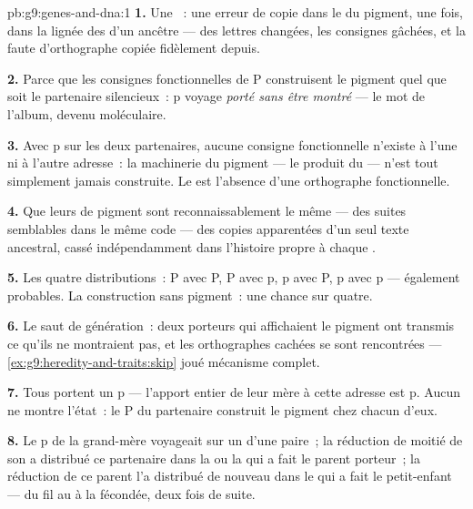 \begin{solution}{pb:g9:genes-and-dna:1}
\textbf{1.} Une ~: une erreur de copie dans le 
du pigment, une fois, dans la lignée des  d'un
ancêtre --- des lettres changées, les consignes gâchées, et
la faute d'orthographe copiée fidèlement depuis.

\textbf{2.} Parce que les consignes fonctionnelles de P
construisent le pigment quel que soit le partenaire
silencieux~: p voyage \emph{porté sans être montré} --- le
mot de l'album, devenu moléculaire.

\textbf{3.} Avec p sur les deux partenaires, aucune consigne
fonctionnelle n'existe à l'une ni à l'autre adresse~: la
machinerie du pigment --- le produit du  --- n'est tout
simplement jamais construite. Le  est l'absence
d'une orthographe fonctionnelle.

\textbf{4.} Que leurs  de pigment sont reconnaissablement
le même  --- des suites semblables dans le même code ---
des copies apparentées d'un seul texte ancestral, cassé
indépendamment dans l'histoire propre à chaque .

\textbf{5.} Les quatre distributions~: P avec P, P avec p, p
avec P, p avec p --- également probables. La construction
sans pigment~: une chance sur quatre.

\textbf{6.} Le saut de génération~: deux porteurs qui
affichaient le pigment ont transmis ce qu'ils ne montraient
pas, et les orthographes cachées se sont rencontrées ---
\cref{ex:g9:heredity-and-traits:skip} joué mécanisme complet.

\textbf{7.} Tous portent un p --- l'apport entier de leur
mère à cette adresse est p. Aucun ne montre l'état~: le P du
partenaire construit le pigment chez chacun d'eux.

\textbf{8.} Le p de la grand-mère voyageait sur un
 d'une paire~; la réduction de moitié de son
 a distribué ce partenaire dans la  ou la
 qui a fait le parent porteur~; la réduction de
ce parent l'a distribué de nouveau dans le  qui a fait
le petit-enfant --- du fil au  à la 
fécondée, deux fois de suite.


\end{solution}
